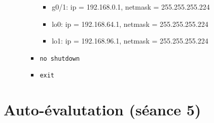 \documentclass[a4paper]{article}
\begin{document}
\begin{enumerate}
\begin{enumerate}
\begin{itemize}
\begin{example}
\begin{itemize}
                \item g0/1: ip = 192.168.0.1, netmask = 255.255.255.224
                \item lo0: ip = 192.168.64.1, netmask = 255.255.255.224
                \item lo1: ip = 192.168.96.1, netmask = 255.255.255.224
            \end{itemize}
        \end{example}
        \item \texttt{no shutdown}
        \item \texttt{exit}
    \end{itemize}
\end{enumerate}





\end{enumerate}















\newpage \section{Auto-évalutation (séance 5)}
\end{document}
